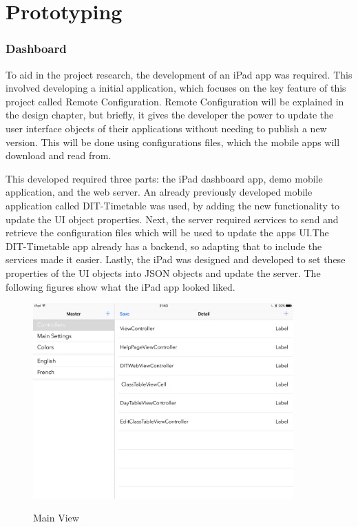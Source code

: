 
\section{Prototyping}

\subsubsection{Dashboard}

To aid in the project research, the development of an iPad app was required. This involved developing a initial application, which focuses on the key feature of this project called Remote Configuration. Remote Configuration will be explained in the design chapter, but briefly, it gives the developer the power to update the user interface objects of their applications without needing to publish a new version. This will be done using configurations files, which the mobile apps will download and read from.

This developed required three parts: the iPad dashboard app, demo mobile application, and the web server. An already previously developed mobile application called DIT-Timetable was used, by adding the new functionality to update the UI object properties. Next, the server required services to send and retrieve the configuration files which will be used to update the apps UI.The DIT-Timetable app already has a backend, so adapting that to include the services made it easier. Lastly, the iPad was designed and developed to set these properties of the UI objects into JSON objects and update the server. The following figures show what the iPad app looked liked.

\begin{figure}[!h]
    \caption{Main View}
    \centering
    \includegraphics[width=100mm]{images/ipad-images/mainview}
    \label{fig:mainview}
\end{figure}

